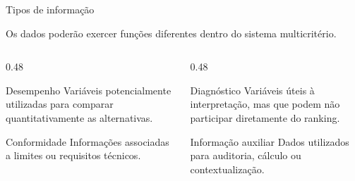 \begin{frame}{Tipos de informação}

    Os dados poderão exercer funções diferentes dentro do sistema
    multicritério.

    \vspace{0.2cm}

    \begin{columns}[T]

        \begin{column}{0.48\textwidth}

            \begin{block}{Desempenho}
                Variáveis potencialmente utilizadas para comparar
                quantitativamente as alternativas.
            \end{block}

            \begin{block}{Conformidade}
                Informações associadas a limites ou requisitos técnicos.
            \end{block}

        \end{column}


        \begin{column}{0.48\textwidth}

            \begin{block}{Diagnóstico}
                Variáveis úteis à interpretação, mas que podem não
                participar diretamente do ranking.
            \end{block}

            \begin{block}{Informação auxiliar}
                Dados utilizados para auditoria, cálculo ou contextualização.
            \end{block}

        \end{column}

    \end{columns}

\end{frame}



